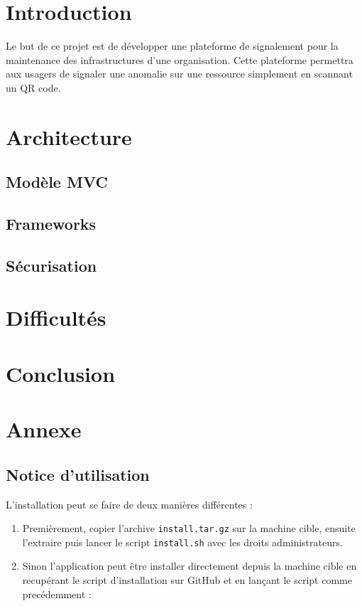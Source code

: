 \chapter{Introduction}

Le but de ce projet est de développer une plateforme de signalement pour la maintenance des
infrastructures d'une organisation. Cette plateforme permettra aux usagers de signaler une
anomalie sur une ressource simplement en scannant un QR code.

\chapter{Architecture}

\section{Modèle MVC}

\section{Frameworks}

\section{Sécurisation}

\chapter{Difficultés}

\chapter{Conclusion}

\chapter{Annexe}

\section{Notice d'utilisation}

L'installation peut se faire de deux manières différentes :

\begin{enumerate}
    \item Premièrement, copier l'archive \verb:install.tar.gz: sur la machine cible, ensuite
        l'extraire puis lancer le script \verb:install.sh: avec les droits administrateurs.

    \item Sinon l'application peut être installer directement depuis la machine cible en recupérant
        le script d'installation sur GitHub et en lançant le script comme precédemment :
\end{enumerate}

